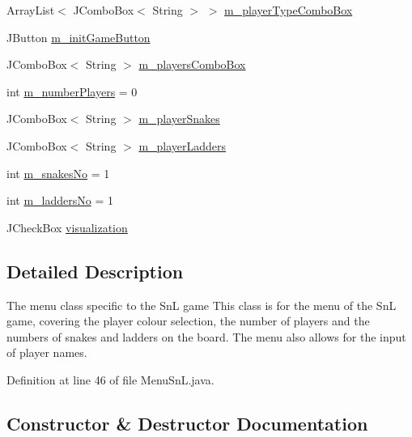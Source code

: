 \begin{DoxyCompactItemize}
\item 
Array\+List$<$ J\+Combo\+Box$<$ String $>$ $>$ \hyperlink{class_menu_1_1_menu_sn_l_a70c6fa4562124ab11bab5d572daf82b3}{m\+\_\+player\+Type\+Combo\+Box}
\item 
J\+Button \hyperlink{class_menu_1_1_menu_sn_l_ac45af15bf2aabd1916063700e1e44f08}{m\+\_\+init\+Game\+Button}
\item 
J\+Combo\+Box$<$ String $>$ \hyperlink{class_menu_1_1_menu_sn_l_a52b5fdac24b1860a453eee6f505208da}{m\+\_\+players\+Combo\+Box}
\item 
int \hyperlink{class_menu_1_1_menu_sn_l_afee3307aa062adfbee4edd14484c8f2c}{m\+\_\+number\+Players} = 0
\item 
J\+Combo\+Box$<$ String $>$ \hyperlink{class_menu_1_1_menu_sn_l_acc735c8e538c308d888618f726ddd344}{m\+\_\+player\+Snakes}
\item 
J\+Combo\+Box$<$ String $>$ \hyperlink{class_menu_1_1_menu_sn_l_a75cae58abbeef1dc893ab2214f84aaad}{m\+\_\+player\+Ladders}
\item 
int \hyperlink{class_menu_1_1_menu_sn_l_a5787c03e612eb9adb0f0ee976810be88}{m\+\_\+snakes\+No} = 1
\item 
int \hyperlink{class_menu_1_1_menu_sn_l_a30c87e65118ddf61c75fa3d9d9abe36e}{m\+\_\+ladders\+No} = 1
\item 
J\+Check\+Box \hyperlink{class_menu_1_1_menu_sn_l_a774bdc16dab9d1c0c882d2212beb70ac}{visualization}
\end{DoxyCompactItemize}


\subsection{Detailed Description}
The menu class specific to the Sn\+L game This class is for the menu of the Sn\+L game, covering the player colour selection, the number of players and the numbers of snakes and ladders on the board. The menu also allows for the input of player names. 

Definition at line 46 of file Menu\+Sn\+L.\+java.



\subsection{Constructor \& Destructor Documentation}
\hypertarget{class_menu_1_1_menu_sn_l_a39167b25cf1ab4be1f66b6a327635e7b}{}

